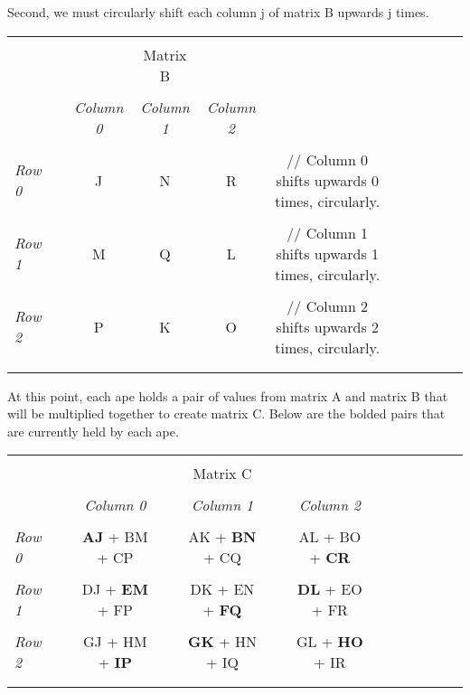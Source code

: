 \documentclass[10pt]{article}
\begin{document}
Second, we must circularly shift each column j of matrix B upwards j times. \par

\begin{tabular}{l*{9}{c}r}
  \\
  \\
  & & & Matrix B \\
  \\
  & &
  \textit{Column 0} &
  \textit{Column 1} &
  \textit{Column 2} & \\
  \\
  \textit{Row 0} & & J & N & R & // Column 0 shifts upwards 0 times, circularly.\\
  \\
  \textit{Row 1} & & M & Q & L & // Column 1 shifts upwards 1 times, circularly.\\
  \\
  \textit{Row 2} & & P & K & O & // Column 2 shifts upwards 2 times, circularly.\\
  \\
  \\
\end{tabular}

At this point, each ape holds a pair of values from matrix A and matrix B that will be multiplied together to create matrix C.  Below are the bolded pairs that are currently held by each ape. \par

\begin{tabular}{l*{11}{c}r}
  \\
  \\
  && && Matrix C \\
  \\
  & &
  \textit{Column 0} &&
  \textit{Column 1} &&
  \textit{Column 2} \\
  \\
  \textit{Row 0} && \textbf{AJ} + BM + CP && AK + \textbf{BN} + CQ && AL + BO + \textbf{CR} \\
  \\
  \textit{Row 1} && DJ + \textbf{EM} + FP && DK + EN + \textbf{FQ} && \textbf{DL} + EO + FR \\
  \\
  \textit{Row 2} && GJ + HM + \textbf{IP} && \textbf{GK} + HN + IQ && GL + \textbf{HO} + IR \\
  \\
  \\
\end{tabular}
\end{document}
